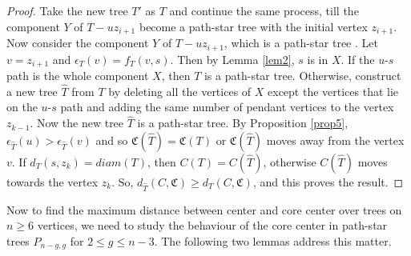 \documentclass[10pt,a4paper]{amsart}
\begin{document}
\begin{proof}
Take the new tree $T'$ as $T$ and continue the same process, till the component $Y$ of $T-uz_{i+1}$ become a path-star tree with the initial vertex $z_{i+1}$. Now consider the component $Y$ of $T-uz_{i+1}$, which is a path-star tree . Let $v=z_{i+1}$ and $\epsilon_{T}(v)=f_T(v,s)$. Then by Lemma \ref{lem2}, $s$ is in $X$. If  the $u$-$s$ path is the whole component $X$, then $T$ is a path-star tree. Otherwise, construct a new tree $\hat{T}$ from $T$ by deleting all the vertices of $X$ except the vertices that lie on the $u$-$s$ path and adding the same number of pendant vertices to the vertex $z_{k-1}$. Now the new tree $\hat{T}$ is a path-star tree. By Proposition \ref{prop5}, $\epsilon_{\hat{T}}(u)>\epsilon_{\hat{T}}(v)$ and so $\mathfrak{C}(\hat{T})=\mathfrak{C}(T)$ or $\mathfrak{C}(\hat{T})$ moves away from the vertex $v$. If $d_T(s,z_k)=diam(T)$, then $C(T)=C(\hat{T})$, otherwise $C(\hat{T})$ moves towards the vertex $z_k$. So, $d_{\hat{T}}(C,\mathfrak{C})\geq d_T(C,\mathfrak{C})$, and this proves the result.
\end{proof}

Now to find the maximum  distance between center and core center over trees on $n\geq 6$ vertices, we need to study the behaviour of the core center in path-star trees $P_{n-g,g}$ for $2\leq g\leq n-3$. The following two lemmas address this matter.
\end{document}
